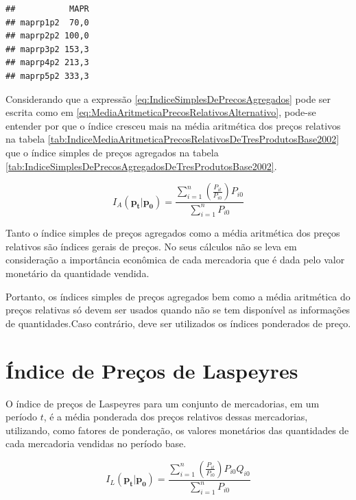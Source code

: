\documentclass[
]{book}
\begin{document}
\begin{verbatim}
##           MAPR
## maprp1p2  70,0
## maprp2p2 100,0
## maprp3p2 153,3
## maprp4p2 213,3
## maprp5p2 333,3
\end{verbatim}

Considerando que a expressão \eqref{eq:IndiceSimplesDePrecosAgregados} pode ser escrita como em \eqref{eq:MediaAritmeticaPrecosRelativosAlternativo}, pode-se entender por que o índice cresceu mais na média aritmética dos preços relativos na tabela \ref{tab:IndiceMediaAritmeticaPrecosRelativosDeTresProdutosBase2002} que o índice simples de preços agregados na tabela \ref{tab:IndiceSimplesDePrecosAgregadosDeTresProdutosBase2002}.

\begin{equation}
  I_A(\mathbf{p_t}| \mathbf{p_0}) = 
  \frac{\sum_{i=1}^{n}\left(\frac{P_{it}}{P_{i0}}\right)P_{i0}}{\sum_{i=1}^{n}P_{i0}}
  \label{eq:MediaAritmeticaPrecosRelativosAlternativo}
\end{equation}

Tanto o índice simples de preços agregados como a média aritmética dos preços relativos são índices gerais de preços. No seus cálculos não se leva em consideração a importância econômica de cada mercadoria que é dada pelo valor monetário da quantidade vendida.

Portanto, os índices simples de preços agregados bem como a média aritmética do preços relativas só devem ser usados quando não se tem disponível as informações de quantidades.Caso contrário, deve ser utilizados os índices ponderados de preço.

\hypertarget{uxedndice-de-preuxe7os-de-laspeyres}{%
\section{Índice de Preços de Laspeyres}\label{uxedndice-de-preuxe7os-de-laspeyres}}

O índice de preços de Laspeyres para um conjunto de mercadorias, em um período \(t\),
é a média ponderada dos preços relativos dessas mercadorias, utilizando, como fatores de ponderação, os valores monetários das quantidades de cada mercadoria vendidas
no período base.

\begin{equation}
  I_L(\mathbf{p_t}| \mathbf{p_0}) = 
  \frac{\sum_{i=1}^{n}\left(\frac{P_{it}}{P_{i0}}\right)P_{i0}Q_{i0}}{\sum_{i=1}^{n}P_{i0}}
  \label{eq:IndicePrecoslaspeyresDefinicao}
\end{equation}
\end{document}
